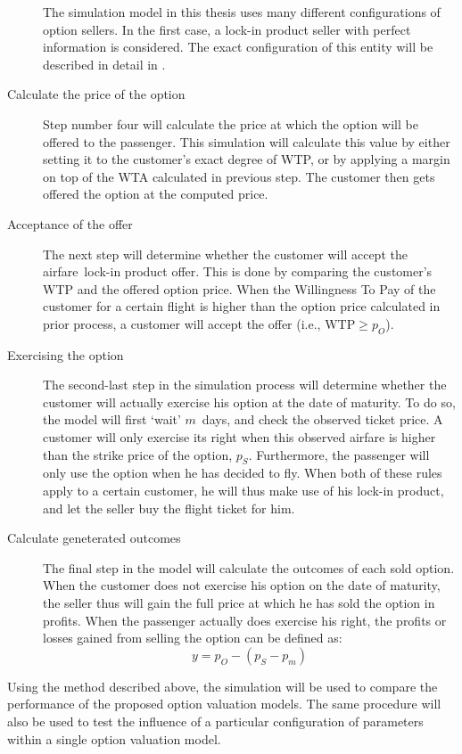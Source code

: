 \begin{description}
The simulation model in this thesis uses many different configurations of option sellers. In the first case, a lock-in product seller with perfect information is considered. The exact configuration of this entity will be described in detail in .

\item[Calculate the price of the option] Step number four will calculate the price at which the option will be offered to the passenger. This simulation will calculate this value by either setting it to the customer's exact degree of WTP, or by applying a margin on top of the WTA calculated in previous step. The customer then gets offered the option at the computed price.

\item[Acceptance of the offer] The next step will determine whether the customer will accept the airfare~lock-in product offer. This is done by comparing the customer's WTP and the offered option price. When the Willingness To Pay of the customer for a certain flight is higher than the option price calculated in prior process, a customer will accept the offer (i.e., $\text{WTP} \ge p_O$).

\item[Exercising the option] The second-last step in the simulation process will determine whether the customer will actually exercise his option at the date of maturity. To do so, the model will first `wait' $m$~days, and check the observed ticket price. A customer will only exercise its right when this observed airfare is higher than the strike price of the option, $p_S$. Furthermore, the passenger will only use the option when he has decided to fly. When both of these rules apply to a certain customer, he will thus make use of his lock-in product, and let the seller buy the flight ticket for him.
    
\item[Calculate geneterated outcomes] The final step in the model will calculate the outcomes of each sold option. When the customer does not exercise his option on the date of maturity, the seller thus will gain the full price at which he has sold the option in profits. When the passenger actually does exercise his right, the profits or losses gained from selling the option can be defined as:
$$ y = p_O - (p_S - p_m) $$
\end{description}

Using the method described above, the simulation will be used to compare the performance of the proposed option valuation models. The same procedure will also be used to test the influence of a particular configuration of parameters within a single option valuation model.


